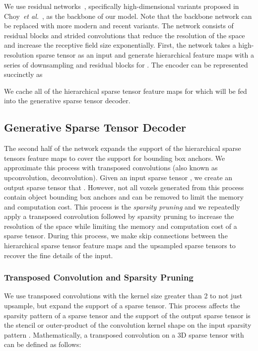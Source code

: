 \documentclass[runningheads]{llncs}
\newcommand{\etal}{\textit{et al.}}
\newcommand{\todo}[1]{}
\begin{document}
We use residual networks~\cite{he2016deep}, specifically high-dimensional variants proposed in Choy~\etal~\cite{minkowskinet}, as the backbone of our model. Note that the backbone network can be replaced with more modern and recent variants. The network consists of residual blocks and strided convolutions that reduce the resolution of the space and increase the receptive field size exponentially. First, the network takes a high-resolution sparse tensor as an input  and generate hierarchical feature maps  with a series of downsampling and residual blocks  for . The encoder can be represented succinctly as

We cache all of the hierarchical sparse tensor feature maps  for  which will be fed into the generative sparse tensor decoder.





\subsection{Generative Sparse Tensor Decoder}
\label{sec:generative_network}





The second half of the network expands the support of the hierarchical sparse tensors feature maps  to cover the support for bounding box anchors. We approximate this process with transposed convolutions (also known as upconvolution, deconvolution). Given an input sparse tensor , we create an output sparse tensor  that . However, not all voxels generated from this process contain object bounding box anchors and can be removed to limit the memory and computation cost. This process is the \textit{sparsity pruning} and we repeatedly apply a transposed convolution followed by sparsity pruning to increase the resolution of the space while limiting the memory and computation cost of a sparse tensor. During this process, we make skip connections between the hierarchical sparse tensor feature maps and the upsampled sparse tensors to recover the fine details of the input.

\subsubsection{Transposed Convolution and Sparsity Pruning}
\label{sec:pruning}

\todo{Emphasize dynamic coordinate generation. This is a novel contribution different from submanifold conv}
We use transposed convolutions with the kernel size greater than 2 to not just upsample, but expand the support of a sparse tensor. This process affects the sparsity pattern of a sparse tensor and the support of the output sparse tensor is the stencil or outer-product of the convolution kernel shape on the input sparsity pattern . Mathematically, a transposed convolution on a 3D sparse tensor  with  can be defined as follows:
\end{document}
